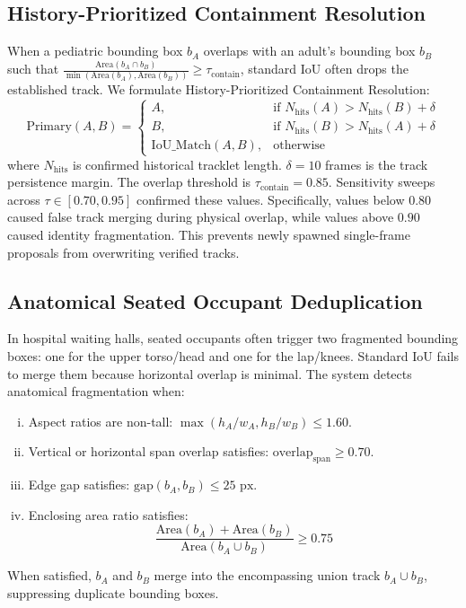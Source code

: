 \subsection{History-Prioritized Containment Resolution}
When a pediatric bounding box $b_A$ overlaps with an adult's bounding box $b_B$ such that $\frac{\text{Area}(b_A \cap b_B)}{\min(\text{Area}(b_A), \text{Area}(b_B))} \ge \tau_{\text{contain}}$, standard IoU often drops the established track. We formulate History-Prioritized Containment Resolution:
\begin{equation}
    \text{Primary}(A, B) = \begin{cases} 
    A, & \text{if } N_{\text{hits}}(A) > N_{\text{hits}}(B) + \delta \\
    B, & \text{if } N_{\text{hits}}(B) > N_{\text{hits}}(A) + \delta \\
    \text{IoU\_Match}(A, B), & \text{otherwise}
\end{cases}
\end{equation}
where $N_{\text{hits}}$ is confirmed historical tracklet length. $\delta = 10$ frames is the track persistence margin. The overlap threshold is $\tau_{\text{contain}} = 0.85$. Sensitivity sweeps across $\tau \in [0.70, 0.95]$ confirmed these values. Specifically, values below $0.80$ caused false track merging during physical overlap, while values above $0.90$ caused identity fragmentation. This prevents newly spawned single-frame proposals from overwriting verified tracks.

\subsection{Anatomical Seated Occupant Deduplication}
In hospital waiting halls, seated occupants often trigger two fragmented bounding boxes: one for the upper torso/head and one for the lap/knees. Standard IoU fails to merge them because horizontal overlap is minimal. The system detects anatomical fragmentation when:
\begin{enumerate}[(i)]
    \item Aspect ratios are non-tall: $\max(h_A/w_A, h_B/w_B) \le 1.60$.
    \item Vertical or horizontal span overlap satisfies: $\text{overlap}_{\text{span}} \ge 0.70$.
    \item Edge gap satisfies: $\text{gap}(b_A, b_B) \le 25\text{ px}$.
    \item Enclosing area ratio satisfies:
    \begin{equation}
        \frac{\text{Area}(b_A) + \text{Area}(b_B)}{\text{Area}(b_A \cup b_B)} \ge 0.75
    \end{equation}
\end{enumerate}
When satisfied, $b_A$ and $b_B$ merge into the encompassing union track $b_A \cup b_B$, suppressing duplicate bounding boxes.

